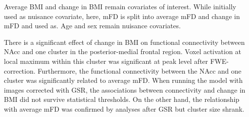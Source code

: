 \documentclass[
]{article}
\begin{document}
Average BMI and change in BMI remain covariates of interest. While initially used as nuisance covariate, here, mFD is split into average mFD and change in mFD and used as. Age and sex remain nuisance covariates.

There is a significant effect of change in BMI on functional connectivity between NAcc and one cluster in the posterior-medial frontal region.
Voxel activation at local maximum within this cluster was significant at peak level after FWE-correction. Furthermore, the functional connectivity between the NAcc and one cluster was significantly related to average mFD.
When running the model with images corrected with GSR, the associations between connectivity and change in BMI did not survive statistical thresholds.
On the other hand, the relationship with average mFD was confirmed by analyses after GSR but cluster size shrank.
\end{document}
